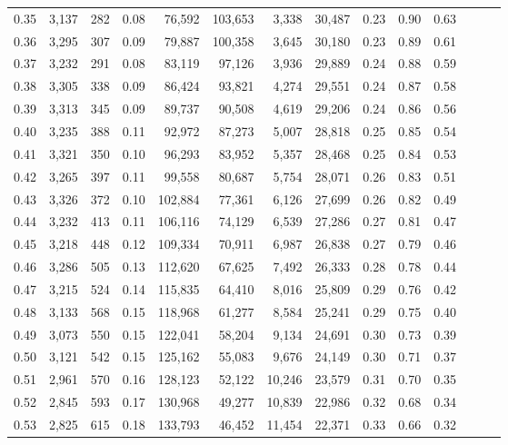 \begin{tabular}{rrrrrrrrrrrrrr}
0.35 &  3,137 &  282 &  0.08 &   76,592 &  103,653 &   3,338 &  30,487 &  0.23 &  0.90 &      0.63 \\
0.36 &  3,295 &  307 &  0.09 &   79,887 &  100,358 &   3,645 &  30,180 &  0.23 &  0.89 &      0.61 \\
0.37 &  3,232 &  291 &  0.08 &   83,119 &   97,126 &   3,936 &  29,889 &  0.24 &  0.88 &      0.59 \\
0.38 &  3,305 &  338 &  0.09 &   86,424 &   93,821 &   4,274 &  29,551 &  0.24 &  0.87 &      0.58 \\
0.39 &  3,313 &  345 &  0.09 &   89,737 &   90,508 &   4,619 &  29,206 &  0.24 &  0.86 &      0.56 \\
0.40 &  3,235 &  388 &  0.11 &   92,972 &   87,273 &   5,007 &  28,818 &  0.25 &  0.85 &      0.54 \\
0.41 &  3,321 &  350 &  0.10 &   96,293 &   83,952 &   5,357 &  28,468 &  0.25 &  0.84 &      0.53 \\
0.42 &  3,265 &  397 &  0.11 &   99,558 &   80,687 &   5,754 &  28,071 &  0.26 &  0.83 &      0.51 \\
0.43 &  3,326 &  372 &  0.10 &  102,884 &   77,361 &   6,126 &  27,699 &  0.26 &  0.82 &      0.49 \\
0.44 &  3,232 &  413 &  0.11 &  106,116 &   74,129 &   6,539 &  27,286 &  0.27 &  0.81 &      0.47 \\
0.45 &  3,218 &  448 &  0.12 &  109,334 &   70,911 &   6,987 &  26,838 &  0.27 &  0.79 &      0.46 \\
0.46 &  3,286 &  505 &  0.13 &  112,620 &   67,625 &   7,492 &  26,333 &  0.28 &  0.78 &      0.44 \\
0.47 &  3,215 &  524 &  0.14 &  115,835 &   64,410 &   8,016 &  25,809 &  0.29 &  0.76 &      0.42 \\
0.48 &  3,133 &  568 &  0.15 &  118,968 &   61,277 &   8,584 &  25,241 &  0.29 &  0.75 &      0.40 \\
0.49 &  3,073 &  550 &  0.15 &  122,041 &   58,204 &   9,134 &  24,691 &  0.30 &  0.73 &      0.39 \\
0.50 &  3,121 &  542 &  0.15 &  125,162 &   55,083 &   9,676 &  24,149 &  0.30 &  0.71 &      0.37 \\
0.51 &  2,961 &  570 &  0.16 &  128,123 &   52,122 &  10,246 &  23,579 &  0.31 &  0.70 &      0.35 \\
0.52 &  2,845 &  593 &  0.17 &  130,968 &   49,277 &  10,839 &  22,986 &  0.32 &  0.68 &      0.34 \\
0.53 &  2,825 &  615 &  0.18 &  133,793 &   46,452 &  11,454 &  22,371 &  0.33 &  0.66 &      0.32 \\

\end{tabular}
